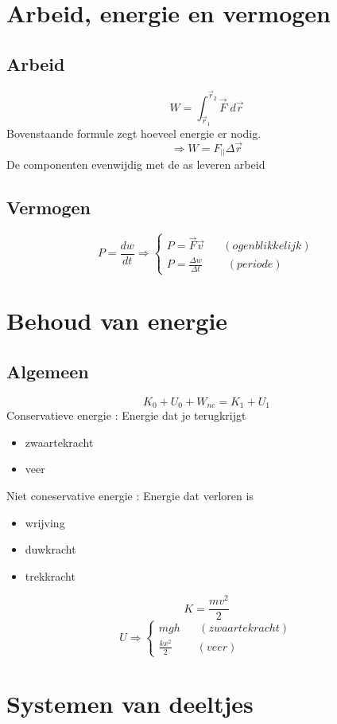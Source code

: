 \documentclass[12pt]{report}
\begin{document}
\chapter{Arbeid, energie en vermogen}
\section{Arbeid}
$$ W = \int_{\overrightarrow{r}_1}^{\overrightarrow{r}_2} \overrightarrow{F} \; d\overrightarrow{r}$$
Bovenstaande formule zegt hoeveel energie er nodig.
$$\Rightarrow W = F_{||} \Delta\overrightarrow{r}$$
De componenten evenwijdig met de as leveren arbeid
\section{Vermogen}
$$ P = \frac{dw}{dt} \Rightarrow 
\begin{cases}
   P = \overrightarrow{F}\overrightarrow{v} \;\;\;\;\;\; (ogenblikkelijk) \\ 
   P = \frac{\Delta w}{\Delta t} \;\;\;\;\;\;\;\; (periode)
\end{cases}
$$
\chapter{Behoud van energie}
\section{Algemeen}
$$K_0 + U_0 + W_{nc} = K_1 + U_1$$
Conservatieve energie : Energie dat je terugkrijgt
\begin{itemize}
 \item zwaartekracht
 \item veer
\end{itemize}
Niet coneservative energie : Energie dat verloren is
\begin{itemize}
 \item wrijving
 \item duwkracht
 \item trekkracht
\end{itemize}

$$ K = \frac{mv^{2}}{2}$$
$$ U \Rightarrow 
\begin{cases}
  mgh \;\;\;\;\;\; (zwaartekracht)\\ 
  \frac{kx^{2}}{2} \;\;\;\;\;\;\;\; (veer)
\end{cases}
$$



\chapter{Systemen van deeltjes}
\end{document}
